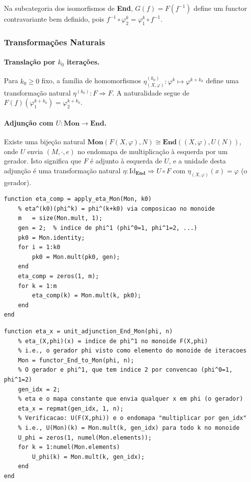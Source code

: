 \begin{remark}
Na subcategoria dos isomorfismos de \textbf{End}, $G(f) = F(f^{-1})$ define um functor contravariante bem definido, pois $f^{-1} \circ \varphi_2^k = \varphi_1^k \circ f^{-1}$.
\end{remark}

\subsubsection{Transformações Naturais}

\paragraph{Translação por $k_0$ iterações.}
Para $k_0 \geq 0$ fixo, a família de homomorfismos $\eta^{(k_0)}_{(X,\varphi)}: \varphi^k \mapsto \varphi^{k+k_0}$ define uma transformação natural $\eta^{(k_0)}: F \Rightarrow F$. A naturalidade segue de $F(f)(\varphi_1^{k+k_0}) = \varphi_2^{k+k_0}$.

\paragraph{Adjunção com $U: \mathbf{Mon} \to \mathbf{End}$.}
Existe uma bijeção natural $\mathbf{Mon}(F(X,\varphi), N) \cong \mathbf{End}((X,\varphi), U(N))$, onde $U$ envia $(M,\cdot,e)$ no endomapa de multiplicação à esquerda por um gerador. Isto significa que $F$ é adjunto à esquerda de $U$, e a unidade desta adjunção é uma transformação natural $\eta: \mathrm{Id}_{\mathbf{End}} \Rightarrow U \circ F$ com $\eta_{(X,\varphi)}(x) = \varphi$ (o gerador).

\begin{lstlisting}[style=matlab, caption={Transformação natural $\eta^{(k_0)}: F \Rightarrow F$ (translação por $k_0$)}]
function eta_comp = apply_eta_Mon(Mon, k0)
    % eta^(k0)(phi^k) = phi^(k+k0) via composicao no monoide
    m   = size(Mon.mult, 1);
    gen = 2;  % indice de phi^1 (phi^0=1, phi^1=2, ...)
    pk0 = Mon.identity;
    for i = 1:k0
        pk0 = Mon.mult(pk0, gen);
    end
    eta_comp = zeros(1, m);
    for k = 1:m
        eta_comp(k) = Mon.mult(k, pk0);
    end
end
\end{lstlisting}

\begin{lstlisting}[style=matlab, caption={Unidade da adjunção $\eta: \mathrm{Id}_{\mathbf{End}} \Rightarrow U \circ F$ --- componente em $(X,\varphi)$}]
function eta_x = unit_adjunction_End_Mon(phi, n)
    % eta_(X,phi)(x) = indice de phi^1 no monoide F(X,phi)
    % i.e., o gerador phi visto como elemento do monoide de iteracoes
    Mon = functor_End_to_Mon(phi, n);
    % O gerador e phi^1, que tem indice 2 por convencao (phi^0=1, phi^1=2)
    gen_idx = 2;
    % eta e o mapa constante que envia qualquer x em phi (o gerador)
    eta_x = repmat(gen_idx, 1, n);
    % Verificacao: U(F(X,phi)) e o endomapa "multiplicar por gen_idx"
    % i.e., U(Mon)(k) = Mon.mult(k, gen_idx) para todo k no monoide
    U_phi = zeros(1, numel(Mon.elements));
    for k = 1:numel(Mon.elements)
        U_phi(k) = Mon.mult(k, gen_idx);
    end
end
\end{lstlisting}